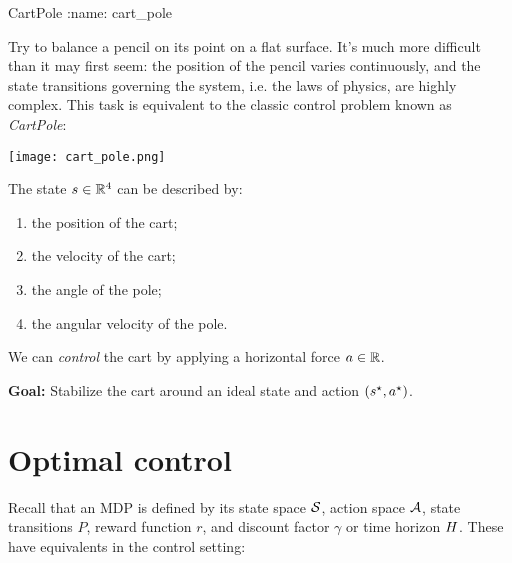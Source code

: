 \documentclass[\main/main]{subfiles}
\begin{document}
\begin{example}{CartPole}
:name: cart_pole

    Try to balance a pencil on its point on a flat surface. It's much more difficult than it may first seem: the position of the pencil varies continuously, and the state transitions governing the system, i.e. the laws of physics, are highly complex.
    This task is equivalent to the classic control problem known as \emph{CartPole}:

    \begin{center}
        \texttt{[image: cart\_pole.png]}
    \end{center}

    The state $\st \in \R^4$ can be described by:

    \begin{enumerate}
        \item the position of the cart;
        \item the velocity of the cart;
        \item the angle of the pole;
        \item the angular velocity of the pole.
    \end{enumerate}

    We can \emph{control} the cart by applying a horizontal force $\act \in \R$.

    \textbf{Goal:} Stabilize the cart around an ideal state and action $(\st^\star, \act^\star)$.
\end{example}




\section{Optimal control}

Recall that an MDP is defined by its state space $\S$, action space $\A$, state transitions $P$, reward function $r$, and discount factor $\gamma$ or time horizon $\hor$. These have equivalents in the control setting:
\end{document}
